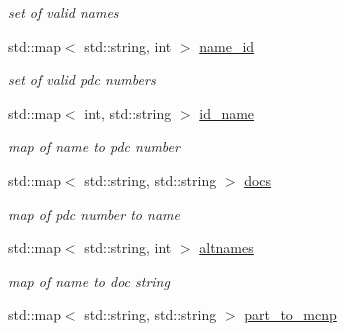 \begin{DoxyCompactItemize}
\begin{DoxyCompactList}\small\item\em set of valid names \end{DoxyCompactList}\item 
std\+::map$<$ std\+::string, int $>$ \hyperlink{namespacepyne_1_1particle_a649721d363b978995fb05f8007e4ecfb}{name\+\_\+id}\hypertarget{namespacepyne_1_1particle_a649721d363b978995fb05f8007e4ecfb}{}\label{namespacepyne_1_1particle_a649721d363b978995fb05f8007e4ecfb}

\begin{DoxyCompactList}\small\item\em set of valid pdc numbers \end{DoxyCompactList}\item 
std\+::map$<$ int, std\+::string $>$ \hyperlink{namespacepyne_1_1particle_adfacb4f56580ef9aa94b6cf6970ac366}{id\+\_\+name}\hypertarget{namespacepyne_1_1particle_adfacb4f56580ef9aa94b6cf6970ac366}{}\label{namespacepyne_1_1particle_adfacb4f56580ef9aa94b6cf6970ac366}

\begin{DoxyCompactList}\small\item\em map of name to pdc number \end{DoxyCompactList}\item 
std\+::map$<$ std\+::string, std\+::string $>$ \hyperlink{namespacepyne_1_1particle_a1134f614fd50d48b1583634857ebc775}{docs}\hypertarget{namespacepyne_1_1particle_a1134f614fd50d48b1583634857ebc775}{}\label{namespacepyne_1_1particle_a1134f614fd50d48b1583634857ebc775}

\begin{DoxyCompactList}\small\item\em map of pdc number to name \end{DoxyCompactList}\item 
std\+::map$<$ std\+::string, int $>$ \hyperlink{namespacepyne_1_1particle_a848d7127667430bd7fa3896ea4145639}{altnames}\hypertarget{namespacepyne_1_1particle_a848d7127667430bd7fa3896ea4145639}{}\label{namespacepyne_1_1particle_a848d7127667430bd7fa3896ea4145639}

\begin{DoxyCompactList}\small\item\em map of name to doc string \end{DoxyCompactList}\item 
std\+::map$<$ std\+::string, std\+::string $>$ \hyperlink{namespacepyne_1_1particle_ab46830f83783c4230c4d30a290d8c5fc}{part\+\_\+to\+\_\+mcnp}\hypertarget{namespacepyne_1_1particle_ab46830f83783c4230c4d30a290d8c5fc}{}\label{namespacepyne_1_1particle_ab46830f83783c4230c4d30a290d8c5fc}


\end{DoxyCompactItemize}
